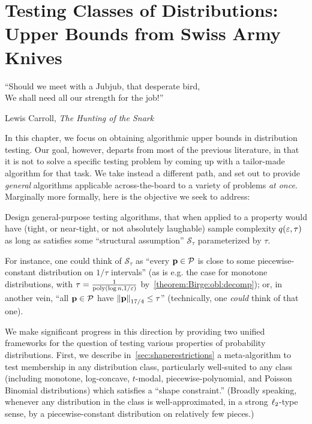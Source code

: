 \chapter{Testing Classes of Distributions: Upper Bounds from Swiss Army Knives}\label{chap:unified:ub}

\epigraph{``Should we meet with a Jubjub, that desperate bird,\\
We shall need all our strength for the job!''}{Lewis Carroll, \textit{The Hunting of the Snark}}

\renewcommand{\theIRL}{\textsf{Succinctness}}
\newcommand*{\inlineref}[1]{\refstepcounter{IRL}({\theIRL})\label{#1}}
\newcommand{\RightComment}[1]{\Comment{\parbox[t]{.30\linewidth}{\small#1}}} %


In this chapter, we focus on obtaining algorithmic upper bounds in distribution testing. Our goal, however, departs from most of the previous literature, in that it is not to solve a specific testing problem by coming up with a tailor-made algorithm for that task. We take instead a different path, and set out to provide \emph{general} algorithms applicable across-the-board to a variety of problems \emph{at once}. Marginally more formally, here is the objective we seek to address:
\begin{problem}\label{problem:ub:general}
Design general-purpose testing algorithms, that when applied to a property \property would have (tight, or near-tight, or not absolutely laughable) sample complexity $q(\eps, \tau)$ as long as \property satisfies some ``structural assumption'' $\mathcal{S}_\tau$ parameterized by $\tau$.
\end{problem}
\noindent For instance, one could think of $\mathcal{S}_\tau$ as ``every $\D\in\property$ is close to some piecewise-constant distribution on $1/\tau$ intervals'' (as is e.g. the case for monotone distributions, with $\tau=\frac{1}{\poly(\log n, 1/\eps)}$ by~\cref{theorem:Birge:obl:decomp}); or, in another vein, ``all $\D\in\property$ have $\norm{\D}_{17/4} \leq \tau$'' (technically, one \emph{could} think of that one).  

We make significant progress in this direction by providing two unified frameworks for the question of testing various properties of probability distributions. First, we describe in~\cref{sec:shaperestrictions} a meta-algorithm to test membership in any distribution class, particularly well-suited to any class (including monotone, log-concave, $t$-modal, piecewise-polynomial, and Poisson Binomial distributions) which satisfies a ``shape constraint.'' (Broadly speaking, whenever any distribution in the class is well-approximated, in a strong $\lp[2]$-type sense, by a piecewise-constant distribution on relatively few pieces.)

